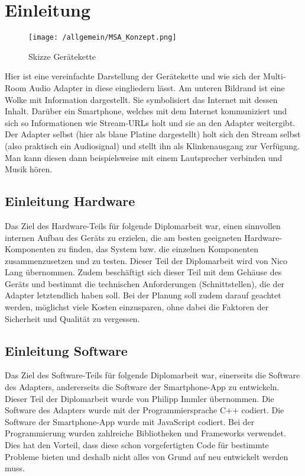 \documentclass[11pt, twoside]{article}
\begin{document}
\newpage
\tableofcontents
\newpage

\pagestyle{fancy} %
\setcounter{page}{1} %

\section{Einleitung}
\begin{figure}[H]
\begin{center}
\texttt{[image: /allgemein/MSA\_Konzept.png]}
\caption{Skizze Gerätekette}
\end{center}
\end{figure}
Hier ist eine vereinfachte Darstellung der Gerätekette und wie sich der Multi-Room Audio Adapter in diese eingliedern lässt.\newline
Am unteren Bildrand ist eine Wolke mit Information dargestellt. Sie symbolisiert das Internet mit dessen Inhalt. Darüber ein Smartphone, welches mit dem Internet kommuniziert und sich so Informationen wie Stream-URLs holt und sie an den Adapter weitergibt. Der Adapter selbst (hier als blaue Platine dargestellt) holt sich den Stream selbst (also praktisch ein Audiosignal) und stellt ihn als Klinkenausgang zur Verfügung. Man kann diesen dann beispielsweise mit einem Lautsprecher verbinden und Musik hören.

\subsection{Einleitung Hardware}
Das Ziel des Hardware-Teils für folgende Diplomarbeit war, einen sinnvollen internen Aufbau des Geräts zu erzielen, die am besten geeigneten Hardware-Komponenten zu finden, das System bzw. die einzelnen Komponenten zusammenzusetzen und zu testen. Dieser Teil der Diplomarbeit wird von Nico Lang übernommen.
Zudem beschäftigt sich dieser Teil mit dem Gehäuse des Geräts und bestimmt die technischen Anforderungen (Schnittstellen), die der Adapter letztendlich haben soll. 
Bei der Planung soll zudem darauf geachtet werden, möglichst viele Kosten einzusparen, ohne dabei die Faktoren der Sicherheit und Qualität zu vergessen.

\subsection{Einleitung Software}
Das Ziel des Software-Teils für folgende Diplomarbeit war, einerseits die Software des Adapters, andererseits die Software der Smartphone-App zu entwickeln. Dieser Teil der Diplomarbeit wurde von Philipp Immler übernommen. Die Software des Adapters wurde mit der Programmiersprache C++ codiert. Die Software der Smartphone-App wurde mit JavaScript codiert. Bei der Programmierung wurden zahlreiche Bibliotheken und Frameworks verwendet. Dies hat den Vorteil, dass diese schon vorgefertigten Code für bestimmte Probleme bieten und deshalb nicht alles von Grund auf neu entwickelt werden muss.
\end{document}
